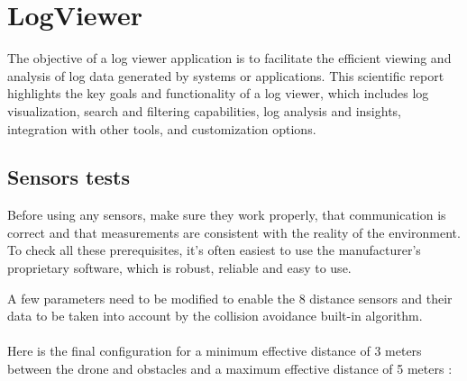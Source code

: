 \section{LogViewer}
The objective of a log viewer application is to facilitate the efficient viewing and analysis of log data generated by systems or applications.
This scientific report highlights the key goals and functionality of a log viewer, which includes log visualization, search and filtering capabilities, log analysis and insights, integration with other tools, and customization options.
\subsection{Sensors tests}
Before using any sensors, make sure they work properly, that communication is correct and that measurements are consistent with the reality of the environment.
To check all these prerequisites, it's often easiest to use the manufacturer's proprietary software, which is robust, reliable and easy to use.

A few parameters need to be modified to enable the 8 distance sensors and their data to be taken into account by the collision avoidance built-in algorithm.
\\ \\
Here is the final configuration for a minimum effective distance of 3 meters between the drone and obstacles and a maximum effective distance of 5 meters :


